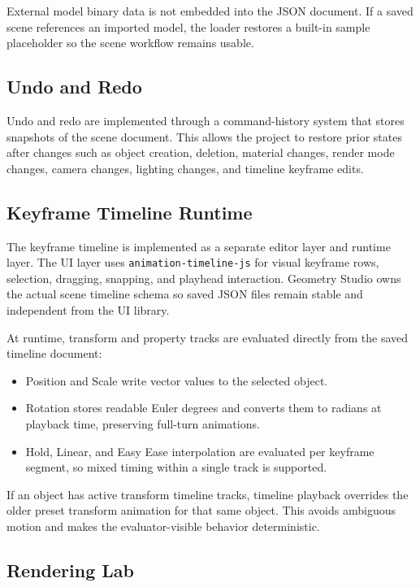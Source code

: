\documentclass[12pt,a4paper]{article}
\begin{document}
External model binary data is not embedded into the JSON document. If a saved
scene references an imported model, the loader restores a built-in sample
placeholder so the scene workflow remains usable.

\subsection{Undo and Redo}

Undo and redo are implemented through a command-history system that stores
snapshots of the scene document. This allows the project to restore prior states
after changes such as object creation, deletion, material changes, render mode
changes, camera changes, lighting changes, and timeline keyframe edits.

\subsection{Keyframe Timeline Runtime}

The keyframe timeline is implemented as a separate editor layer and runtime
layer. The UI layer uses \texttt{animation-timeline-js} for visual keyframe rows,
selection, dragging, snapping, and playhead interaction. Geometry Studio owns the
actual scene timeline schema so saved JSON files remain stable and independent
from the UI library.

At runtime, transform and property tracks are evaluated directly from the saved
timeline document:
\begin{itemize}
  \item Position and Scale write vector values to the selected object.
  \item Rotation stores readable Euler degrees and converts them to radians at
  playback time, preserving full-turn animations.
  \item Hold, Linear, and Easy Ease interpolation are evaluated per keyframe
  segment, so mixed timing within a single track is supported.
\end{itemize}

If an object has active transform timeline tracks, timeline playback overrides
the older preset transform animation for that same object. This avoids ambiguous
motion and makes the evaluator-visible behavior deterministic.

\subsection{Rendering Lab}
\end{document}
